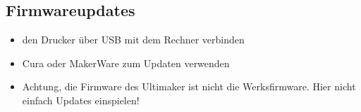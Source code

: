 \documentclass{\basedir/fablab-document}
\begin{document}
\subsection{Firmwareupdates}

\begin{itemize}
\item den Drucker über USB mit dem Rechner verbinden
\item Cura oder MakerWare zum Updaten verwenden
\item Achtung, die Firmware des Ultimaker ist nicht die Werksfirmware. Hier nicht einfach Updates einspielen! 
\end{itemize}

\end{document}
